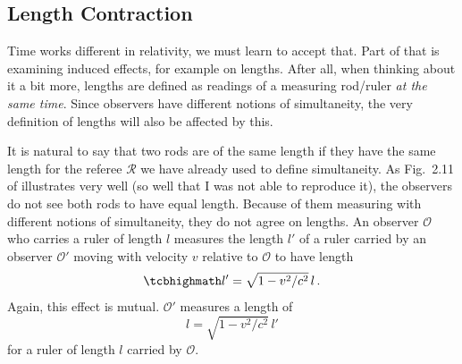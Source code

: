 \documentclass[../relativity_main.tex]{subfiles}
\begin{document}
		\subsection{Length Contraction}
Time works different in relativity, we must learn to accept that. Part of that is examining induced effects, for example on lengths. After all, when thinking about it a bit more, lengths are defined as readings of a measuring rod/ruler \emph{at the same time}. Since observers have different notions of simultaneity, the very definition of lengths will also be affected by this.


It is natural to say that two rods are of the same length if they have the same length for the referee $\mathcal{R}$ we have already used to define simultaneity. As Fig.~2.11 of \cite{dragon_geometry_srt} illustrates very well (so well that I was not able to reproduce it), the observers do not see both rods to have equal length. Because of them measuring with different notions of simultaneity, they do not agree on lengths. An observer $\mathcal{O}$ who carries a ruler of length $l$ measures the length $l'$ of a ruler carried by an observer $\mathcal{O}'$ moving with velocity $v$ relative to $\mathcal{O}$ to have length
\begin{equation}\label{eq:length_contraction}
	\eqbox{
	l' = \sqrt{1 - v^2 / c^2} \, l
	} \, .
\end{equation}
Again, this effect is mutual. $\mathcal{O}'$ measures a length of
\begin{equation*}
	l = \sqrt{1 - v^2 / c^2} \, l'
\end{equation*}
for a ruler of length $l$ carried by $\mathcal{O}$.



\end{document}
